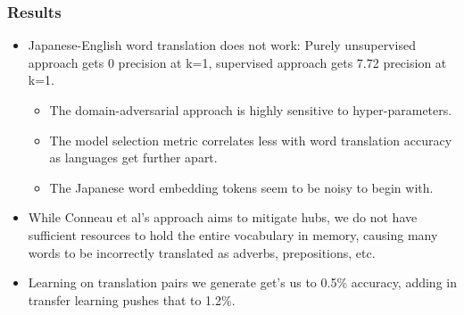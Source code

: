 \documentclass{beamer}
\begin{document}
\begin{frame}
  \frametitle{Results}
  \begin{itemize}
  \item Japanese-English word translation does not work: Purely unsupervised
    approach gets 0 precision at k=1, supervised approach gets 7.72 precision
    at k=1.
    \begin{itemize}
    \item The domain-adversarial approach is highly sensitive to hyper-parameters.
    \item The model selection metric correlates less with word translation
      accuracy as languages get further apart.
    \item The Japanese word embedding tokens seem to be noisy to begin with.
    \end{itemize}
  \item While Conneau et al's approach aims to mitigate hubs, we do not have
    sufficient resources to hold the entire vocabulary in memory, causing many
    words to be incorrectly translated as adverbs, prepositions, etc.
  \item Learning on translation pairs we generate get's us to 0.5\% accuracy,
    adding in transfer learning pushes that to 1.2\%.
  \end{itemize}
\end{frame}
\end{document}
